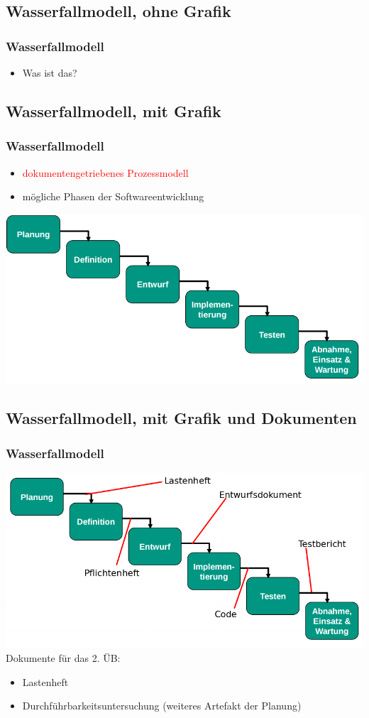 \documentclass[18pt]{beamer}
\begin{document}
	\subsection{Wasserfallmodell, ohne Grafik}
	\begin{frame}
		\frametitle{Wasserfallmodell}
		\begin{itemize}
			\item Was ist das? 
		\end{itemize}
	\end{frame}
	
	\subsection{Wasserfallmodell, mit Grafik}
	\begin{frame}
		\frametitle{Wasserfallmodell}
		\begin{itemize}
			\item \textcolor{red}{dokumentengetriebenes Prozessmodell} \pause
			\item mögliche Phasen der Softwareentwicklung \pause
		\end{itemize}
		\includegraphics[scale=0.4]{./pics/tut1/waterfall_without-docs.png}
	\end{frame}
	
	\subsection{Wasserfallmodell, mit Grafik und Dokumenten}
	\begin{frame}
		\frametitle{Wasserfallmodell}
		\includegraphics[scale=0.4]{./pics/tut1/waterfall_with-docs.png}
		\pause
		Dokumente für das 2. ÜB: 
		\begin{itemize}
			\item Lastenheft
			\item Durchführbarkeitsuntersuchung (weiteres Artefakt der Planung)
		\end{itemize}
	\end{frame}
\end{document}
